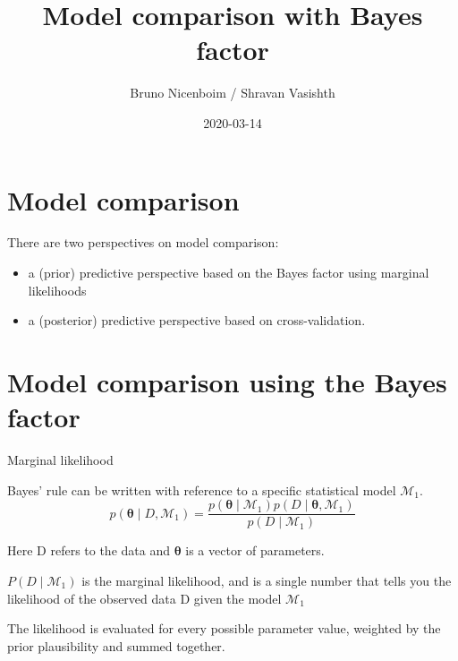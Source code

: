 \documentclass[12pt,ignorenonframetext,aspectratio=169]{beamer}
\title{Model comparison with Bayes factor}
\author{Bruno Nicenboim / Shravan Vasishth}
\date{2020-03-14}
\providecommand{\tightlist}{%
  \setlength{\itemsep}{0pt}\setlength{\parskip}{0pt}}
\begin{document}
\frame{\titlepage}

\begin{frame}
\tableofcontents[hideallsubsections]
\end{frame}
\hypertarget{model-comparison}{%
\section{Model comparison}\label{model-comparison}}

There are two perspectives on model comparison:

\begin{itemize}
\tightlist
\item
  a (prior) predictive perspective based on the Bayes factor using marginal likelihoods
\item
  a (posterior) predictive perspective based on cross-validation.
\end{itemize}

\hypertarget{model-comparison-using-the-bayes-factor}{%
\section{Model comparison using the Bayes factor}\label{model-comparison-using-the-bayes-factor}}

\begin{frame}{Marginal likelihood}
\protect\hypertarget{marginal-likelihood}{}

Bayes' rule can be written with reference to a specific statistical model \(\mathcal{M}_1\).
\begin{equation}
p(\boldsymbol{\theta} \mid D, \mathcal{M}_1) = \frac{p(\boldsymbol{\theta} \mid \mathcal{M}_1) p(D\mid \boldsymbol{\theta}, \mathcal{M}_1) }{p(D\mid \mathcal{M}_1)}
\end{equation}

Here D refers to the data and \(\boldsymbol{\theta}\) is a vector of parameters.

\(P(D\mid \mathcal{M}_1)\) is the marginal likelihood, and is a single number that tells you the likelihood of the observed data D given the model \(\mathcal{M}_1\)

The likelihood is evaluated for every possible parameter value, weighted by the prior plausibility and summed together.

\end{frame}
\end{document}
